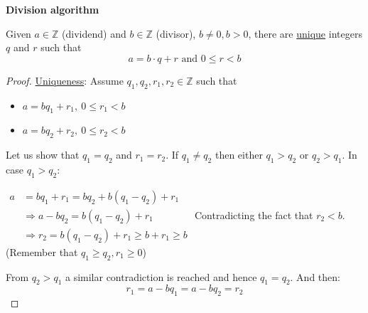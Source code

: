 \documentclass[12pt, a4paper]{book}
\begin{document}
\begin{thm}
    \textbf{Division algorithm}

    Given $a\in\mathbb{Z}$ (dividend) and $b\in\mathbb{Z}$ (divisor), $b\neq 0, b>0$, there are \underline{unique} integers $q$ and $r$ such that
    \[
        a = b \cdot q + r \text{ and } 0\leq r < b
    \]
    \begin{proof}
        \underline{Uniqueness}: Assume $q_1, q_2, r_1, r_2 \in\mathbb{Z}$ such that
        \begin{itemize}
            \item $a = b q_1 + r_1,\ 0\leq r_1 < b$
            \item $a = b q_2 + r_2,\ 0\leq r_2 < b$
        \end{itemize}
        Let us show that $q_1 = q_2$ and $r_1 = r_2$. If $q_1 \neq q_2$ then either $q_1 > q_2$ or $q_2 > q_1$. In case $q_1 > q_2$:

        $
        \begin{aligned}
            a &= b q_1 + r_1 = b q_2 + b(q_1 - q_2) + r_1 \\
            &\Rightarrow a - b q_2 = b(q_1 - q_2) + r_1 \\
            &\Rightarrow r_2 = b(q_1 - q_2) + r_1 \geq b + r_1 \geq b
        \end{aligned}
        $
        Contradicting the fact that $r_2 < b$. (Remember that $q_1 \geq q_2, r_1\geq 0$)

        From $q_2 > q_1$ a similar contradiction is reached and hence $q_1 = q_2$. And then:
        \[
            r_1 = a - b q_1 = a - b q_2 = r_2
        \]
    \end{proof}
\end{thm}
\end{document}
